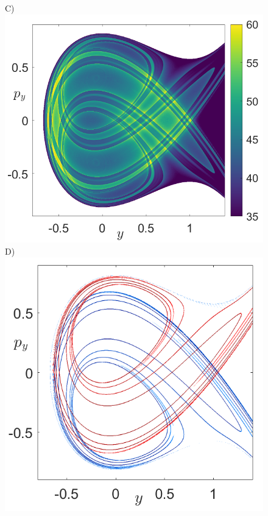 \documentclass[8pt]{article}
\begin{document}
\begin{figure}[htbp]
\begin{center}
		C)\includegraphics[scale=0.36]{LDs_Henon_tau_10_x_0_E_1div3.png}
		D)\includegraphics[scale=0.36]{Mani_Henon_tau_10_x_0_E_1div3.png}

\end{center}
\end{figure}
\end{document}
